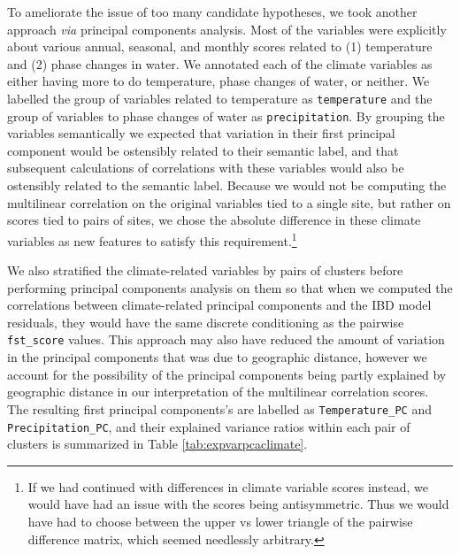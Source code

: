\documentclass[
  letterpaper,
  DIV=11,
  numbers=noendperiod]{scrreprt}
\begin{document}
To ameliorate the issue of too many candidate hypotheses, we took
another approach \textit{via} principal components analysis. Most of the
variables were explicitly about various annual, seasonal, and monthly
scores related to (1) temperature and (2) phase changes in water. We
annotated each of the climate variables as either having more to do
temperature, phase changes of water, or neither. We labelled the group
of variables related to temperature as \texttt{temperature} and the
group of variables to phase changes of water as \texttt{precipitation}.
By grouping the variables semantically we expected that variation in
their first principal component would be ostensibly related to their
semantic label, and that subsequent calculations of correlations with
these variables would also be ostensibly related to the semantic label.
Because we would not be computing the multilinear correlation on the
original variables tied to a single site, but rather on scores tied to
pairs of sites, we chose the absolute difference in these climate
variables as new features to satisfy this
requirement.\footnote{If we had continued with differences in climate variable scores instead, we would have had an issue with the scores being antisymmetric. Thus we would have had to choose between the upper vs lower triangle of the pairwise difference matrix, which seemed needlessly arbitrary.}

We also stratified the climate-related variables by pairs of clusters
before performing principal components analysis on them so that when we
computed the correlations between climate-related principal components
and the IBD model residuals, they would have the same discrete
conditioning as the pairwise \texttt{fst\_score} values. This approach
may also have reduced the amount of variation in the principal
components that was due to geographic distance, however we account for
the possibility of the principal components being partly explained by
geographic distance in our interpretation of the multilinear correlation
scores. The resulting first principal components's are labelled as
\texttt{Temperature\_PC} and \texttt{Precipitation\_PC}, and their
explained variance ratios within each pair of clusters is summarized in
Table \ref{tab:expvarpcaclimate}.
\end{document}
